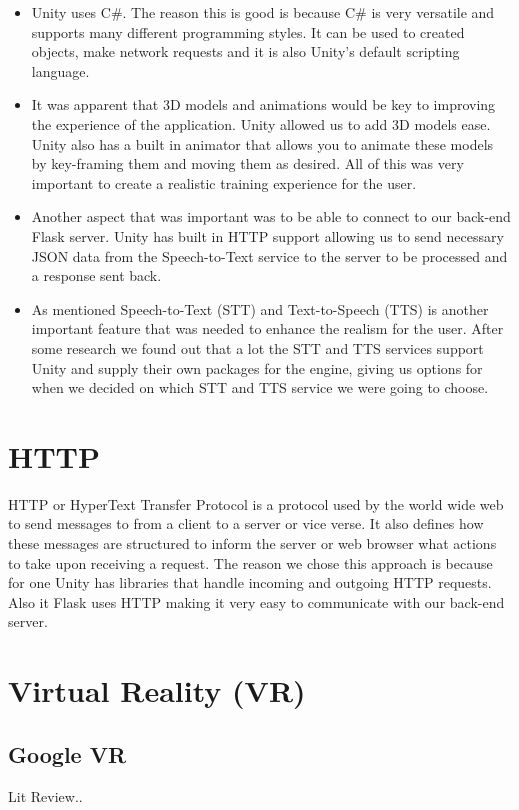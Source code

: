 \begin{itemize}
  \item Unity uses C\#. The reason this is good is because C\# is very versatile and supports many different programming styles. It can be used to created objects, make network requests and it is also Unity's default scripting language.
  \item It was apparent that 3D models and animations would be key to improving the experience of the application. Unity allowed us to add 3D models ease. Unity also has a built in animator that allows you to animate these models by key-framing them and moving them as desired. All of this was very important to create a realistic training experience for the user.
  \item Another aspect that was important was to be able to connect to our back-end Flask server. Unity has built in HTTP support allowing us to send necessary JSON data from the Speech-to-Text service to the server to be processed and a response sent back.
  \item As mentioned Speech-to-Text (STT) and Text-to-Speech (TTS) is another important feature that was needed to enhance the realism for the user. After some research we found out that a lot the STT and TTS services support Unity and supply their own packages for the engine, giving us options for when we decided on which STT and TTS service we were going to choose.
\end{itemize}


\section{HTTP}
HTTP or HyperText Transfer Protocol is a protocol used by the world wide web to send messages to from a client to a server or vice verse. It also defines how these messages are structured to inform the server or web browser what actions to take upon receiving a request. The reason we chose this approach is because for one Unity has libraries that handle incoming and outgoing HTTP requests. Also it Flask uses HTTP making it very easy to communicate with our back-end server.

\section{Virtual Reality (VR)}
\subsection{Google VR}
Lit Review..
